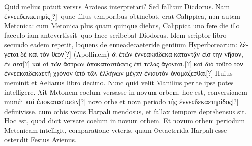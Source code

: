 Quid melius potuit versus Arateos interpretari?
Sed fallitur Diodorus.
Nam \textgreek{ἐννεαδεκαετηρὶς[?]}, quae illius temporibus obtinebat,
 erat
Calippica, non autem Metonica: cum Metonica plus quam
quinque diebus, Calippica uno fere die illo faeculo iam antevertissit,
quo haec scribebat Diodorus.
Idem scriptor libro secundo
eadem repetit, loquens de enneadecaeteride gentium Hyperborearum:
\textgreek{λέγεται δὲ καὶ τὸν θεὸν[?]} (Apollinem)
 \textgreek{δἰ ἐτῶν ἐννεακαίδεκα καταντᾷν
εἰσ την νῆσον, ἐν σεσ[?] καὶ αἱ τῶν ἄστρων ἀποκαταστάσεις ἐπὶ τελος ἄγονται.[?]}
\textgreek{καὶ
διὰ τοῦτο τὸν ἐννεακαιδεκαετῆ χρόνον ὑπὸ τῶν ἑλλήνων μέγαν ἐνιαυτὸν
 ὀνομάζεσθαι[?]}
Huius meminit et Aelianus libro decimo.
Nunc quid
velit Manilius per te ipse potes intelligere.
Ait Metonem coelum
versasse in novum orbem, hoc est, conversionem mundi
 \textgreek{καὶ ἀποκαταστασιν[?]}
novo orbe et nova periodo \textgreek{τὴς ἐννεαδεκαετηρίδος[?]} definivisse, cum
orbis vetus Harpali mendosus, et fallax tempore deprehensus sit.
Hoc est, quod dicit versare coelum in novum orbem.
Et novum
orbem periodum Metonicam intelligit, comparatione veteris, quam
Octaeterida Harpali esse ostendit Festus Avienus.

